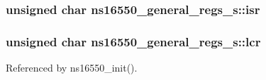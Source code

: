 \hypertarget{structns16550__general__regs__s_afc8dd5bfaf88f0333a5c869b75b523a1}{
\subsubsection[{isr}]{\setlength{\rightskip}{0pt plus 5cm}unsigned char ns16550\-\_\-general\-\_\-regs\-\_\-s\-::isr}}\label{structns16550__general__regs__s_afc8dd5bfaf88f0333a5c869b75b523a1}
\hypertarget{structns16550__general__regs__s_a4681aada45f52eedb19c8d27bcba4681}{
\subsubsection[{lcr}]{\setlength{\rightskip}{0pt plus 5cm}unsigned char ns16550\-\_\-general\-\_\-regs\-\_\-s\-::lcr}}\label{structns16550__general__regs__s_a4681aada45f52eedb19c8d27bcba4681}


Referenced by ns16550\-\_\-init().

